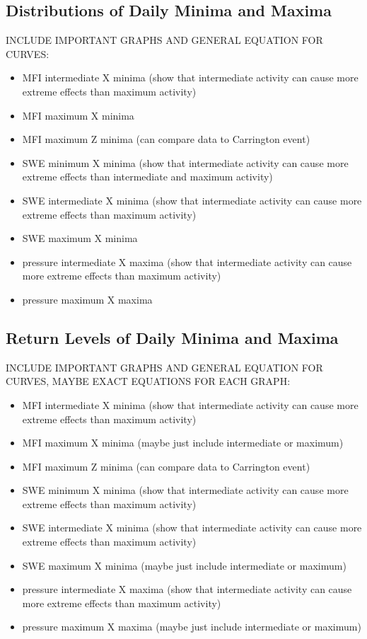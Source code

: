 \documentclass[12pt]{article}
\begin{document}
    \subsection{Distributions of Daily Minima and Maxima}\label{sec:dailydist}
        INCLUDE IMPORTANT GRAPHS AND GENERAL EQUATION FOR CURVES:
        \begin{itemize}
            \item MFI intermediate X minima (show that intermediate activity can cause more extreme effects than maximum activity)
            \item MFI maximum X minima
            \item MFI maximum Z minima (can compare data to Carrington event)
            \item SWE minimum X minima (show that intermediate activity can cause more extreme effects than intermediate and maximum activity)
            \item SWE intermediate X minima (show that intermediate activity can cause more extreme effects than maximum activity)
            \item SWE maximum X minima
            \item pressure intermediate X maxima (show that intermediate activity can cause more extreme effects than maximum activity)
            \item pressure maximum X maxima
        \end{itemize}
    \subsection{Return Levels of Daily Minima and Maxima}\label{sec:returnperiod}
        INCLUDE IMPORTANT GRAPHS AND GENERAL EQUATION FOR CURVES, MAYBE EXACT EQUATIONS FOR EACH GRAPH:
        \begin{itemize}
            \item MFI intermediate X minima (show that intermediate activity can cause more extreme effects than maximum activity)
            \item MFI maximum X minima (maybe just include intermediate or maximum)
            \item MFI maximum Z minima (can compare data to Carrington event)
            \item SWE minimum X minima (show that intermediate activity can cause more extreme effects than maximum activity)
            \item SWE intermediate X minima (show that intermediate activity can cause more extreme effects than maximum activity)
            \item SWE maximum X minima (maybe just include intermediate or maximum)
            \item pressure intermediate X maxima (show that intermediate activity can cause more extreme effects than maximum activity)
            \item pressure maximum X maxima  (maybe just include intermediate or maximum)
        \end{itemize}
\end{document}
